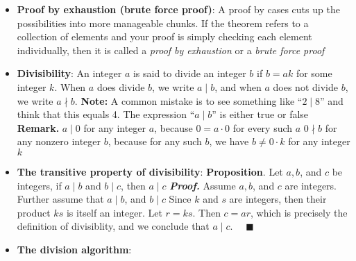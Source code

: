 \documentclass{report}
\begin{document}
\begin{itemize}
\begin{tcolorbox}[penv]
            \end{tcolorbox}
        \item \textbf{Proof by exhaustion (brute force proof)}: A proof by cases cuts up the possibilities into more manageable chunks. If the theorem refers to a collection of elements and your proof is simply checking each element individually, then it is called a \textit{proof by exhaustion} or a \textit{brute force proof}
        \item \textbf{Divisibility}: An integer \(a\) is said to divide an integer \(b\) if \(b = ak\) for some integer \(k\). When \(a\) does divide \(b\), we write \(a \mid b\), and when \(a\) does not divide \(b\), we write \(a \nmid b\).
            \bigbreak \noindent 
            \textbf{Note:} A common mistake is to see something like “$2 \mid 8$” and think that this equals 4. The expression “$a \mid  b$” is either true or false
            \bigbreak \noindent 
            \textbf{Remark.} $a\mid 0$ for any integer $a$, because $0 = a \cdot 0$ for every such $a$
            \bigbreak \noindent 
            $0\nmid b$ for any nonzero integer $b$, because for any such $b$, we have $b\ne 0 \cdot k $ for any integer $k$
        \item \textbf{The transitive property of divisibility}:
            \bigbreak \noindent 
            \textbf{Proposition}. Let $a,b$, and $c$ be integers, if $a\mid b$ and $b \mid c$, then $a\mid c$
            \bigbreak \noindent 
            \textbf{\textit{Proof.}} Assume $a,b$, and $c$ are integers. Further assume that $a\mid b$, and $b\mid c$
            Since $k$ and $s$ are integers, then their product $ks$ is itself an integer. Let $r = ks$. Then $c  = ar$, which is precisely the definition of divisiblity, and we conclude that $a\mid c$. $\quad \blacksquare$
        \item \textbf{The division algorithm}:

\end{itemize}
\end{document}
